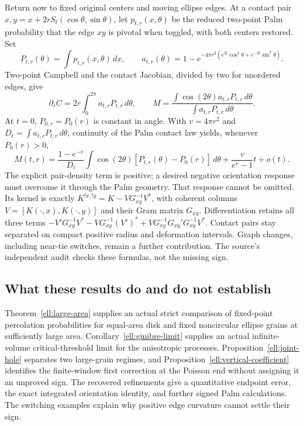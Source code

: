 \documentclass[11pt,a4paper]{article}
\theoremstyle{definition}
\theoremstyle{remark}
\numberwithin{equation}{section}
\begin{document}
Return now to fixed original centers and moving ellipse edges.
At a contact pair $x,y=x+2rS_t(\cos\theta,\sin\theta)$, let
$p_{t,r}(x,\theta)$ be the reduced two-point Palm probability that
the edge $xy$ is pivotal when toggled, with both centers restored.
Set
\[
 P_{t,r}(\theta)=\int p_{t,r}(x,\theta)\,dx,\qquad
 a_{t,r}(\theta)=1-e^{-4\pi r^2
                  (e^{2t}\cos^2\theta+e^{-2t}\sin^2\theta)}.
\]
Two-point Campbell and the contact Jacobian, divided by two for
unordered edges, give
\[
 \partial_r C=2r\int_0^{2\pi}a_{t,r}P_{t,r}\,d\theta,\qquad
 M=\frac{\int\cos(2\theta)a_{t,r}P_{t,r}\,d\theta}
          {\int a_{t,r}P_{t,r}\,d\theta}.
\]
At $t=0$, $P_{0,r}=P_0(r)$ is constant in angle. With $v=4\pi r^2$
and $D_t=\int a_{t,r}P_{t,r}\,d\theta$, continuity of the Palm
contact law yields, whenever $P_0(r)>0$,
\[
 M(t,r)=\frac{1-e^{-v}}{D_t}\int\cos(2\theta)
                   [P_{t,r}(\theta)-P_0(r)]\,d\theta
              +\frac{v}{e^v-1}t+o(t).
\]
The explicit pair-density term is positive; a desired negative
orientation response must overcome it through the Palm geometry.
That response cannot be omitted. Its kernel is exactly
$K^{!x,!y}=K-VG_{xy}^{-1}V^*$, with coherent columns
$V=[K(\cdot,x),K(\cdot,y)]$ and their Gram matrix $G_{xy}$.
Differentiation retains all three terms
$-V'G_{xy}^{-1}V^*-VG_{xy}^{-1}(V')^*
+VG_{xy}^{-1}G_{xy}'G_{xy}^{-1}V^*$.
Contact pairs stay separated on compact positive radius and
deformation intervals. Graph changes, including near-tie switches,
remain a further contribution. The source's independent audit
checks these formulas, not the missing sign.

\subsection{What these results do and do not establish}

Theorem~\ref{ell:large-area} supplies an actual strict comparison
of fixed-point percolation probabilities for equal-area disk
and fixed noncircular ellipse grains at sufficiently large
area.  Corollary~\ref{ell:ginibre-limit} supplies an actual
infinite-volume critical-threshold limit for the anisotropic
processes.  Proposition~\ref{ell:joint-hole} separates two
large-grain regimes, and Proposition~\ref{ell:vertical-coefficient}
identifies the finite-window first correction at the Poisson
end without assigning it an unproved sign. The recovered refinements
give a quantitative endpoint error, the exact integrated orientation
identity, and further signed Palm calculations. The switching examples
explain why positive edge curvature cannot settle their sign.
\end{document}
